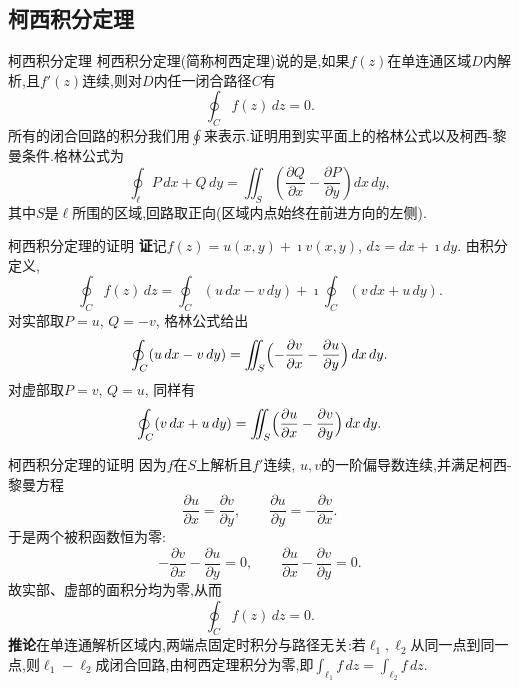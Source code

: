 \documentclass[fontset=windows, chinese, 10pt]{beamer}
\begin{document}
  \subsection{柯西积分定理}

  \begin{frame}{柯西积分定理}
    柯西积分定理(简称柯西定理)说的是,如果$f(z)$在单连通区域$D$内解析,且$f'(z)$连续,则对$D$内任一闭合路径$C$有
\begin{equation}
    \oint_C f(z)\, dz = 0.
\end{equation}
所有的闭合回路的积分我们用$\oint$来表示.证明用到实平面上的格林公式以及柯西-黎曼条件.格林公式为
\begin{equation}
    \oint_\ell P\, dx + Q\, dy = \iint_S \left( \frac{\partial Q}{\partial x} - \frac{\partial P}{\partial y}  \right) dx\, dy,
\end{equation}
其中$S$是$\ell$所围的区域,回路取正向(区域内点始终在前进方向的左侧).
\end{frame}

\begin{frame}{柯西积分定理的证明}
\small
\textbf{证}\quad 记$f(z)=u(x,y)+\imath v(x,y)$, $dz=dx+\imath dy$. 由积分定义,
\begin{equation}
    \oint_C f(z)\, dz
    = \oint_C (u\,dx - v\,dy)
    + \imath \oint_C (v\,dx + u\,dy).
\end{equation}
对实部取$P=u$, $Q=-v$, 格林公式给出
\begin{equation}
    \oint_C (u\,dx - v\,dy)
    = \iint_S \Bigl( -\frac{\partial v}{\partial x} - \frac{\partial u}{\partial y} \Bigr)\, dx\, dy.
\end{equation}
对虚部取$P=v$, $Q=u$, 同样有
\begin{equation}
    \oint_C (v\,dx + u\,dy)
    = \iint_S \Bigl( \frac{\partial u}{\partial x} - \frac{\partial v}{\partial y} \Bigr)\, dx\, dy.
\end{equation}
\end{frame}

\begin{frame}{柯西积分定理的证明}
\small
因为$f$在$S$上解析且$f'$连续, $u,v$的一阶偏导数连续,并满足柯西-黎曼方程
\begin{equation}
    \frac{\partial u}{\partial x}=\frac{\partial v}{\partial y},\qquad
    \frac{\partial u}{\partial y}=-\frac{\partial v}{\partial x}.
\end{equation}
于是两个被积函数恒为零:
\begin{equation}
    -\frac{\partial v}{\partial x}-\frac{\partial u}{\partial y}=0,\qquad
    \frac{\partial u}{\partial x}-\frac{\partial v}{\partial y}=0.
\end{equation}
故实部、虚部的面积分均为零,从而
\[
    \oint_C f(z)\, dz = 0.
\]
\textbf{推论}\quad 在单连通解析区域内,两端点固定时积分与路径无关:若$\ell_1,\ell_2$从同一点到同一点,则$\ell_1-\ell_2$成闭合回路,由柯西定理积分为零,即$\int_{\ell_1}f\,dz=\int_{\ell_2}f\,dz$.
\end{frame}
\end{document}
